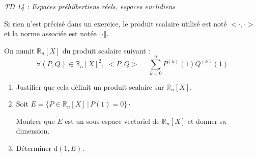 \documentclass[a4paper,10pt]{report}
\begin{document}
\everymath{\displaystyle}


\begin{center}
\textit{{ {\huge TD 14 : Espaces préhilbertiens réels, espaces euclidiens}}}
\end{center}

\bigskip

\noindent Si rien n'est précisé dans un exercice, le produit scalaire utilisé est noté $< \cdot , \cdot >$ et la norme associée est notée $\Vert \cdot \Vert$.

\medskip


\begin{Exercice}{} 
On munit $\mathbb{R}_n[X]$ du produit scalaire suivant :
$$ \forall (P,Q) \in \mathbb{R}_n[X]^2, \; <P,Q> = \sum_{k=0}^{n} P^{(k)}(1)Q^{(k)}(1)$$
\begin{enumerate}
\item Justifier que cela définit un produit scalaire sur $\mathbb{R}_n[X]$.
\item Soit $E= \lbrace P \in \mathbb{R}_n[X] \, \vert \, P(1)=0 \rbrace \cdot$

\noindent Montrer que $E$ est un sous-espace vectoriel de $\mathbb{R}_n[X]$ et donner sa dimension.
\item Déterminer $\textrm{d}(1,E)$.
\end{enumerate}
\end{Exercice}
\end{document}

